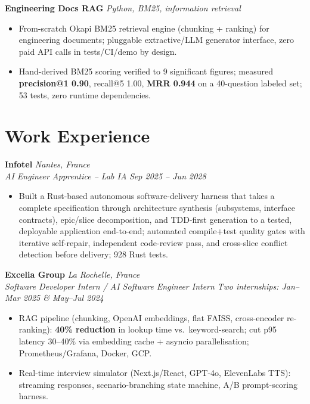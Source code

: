 \documentclass[10pt]{article}
\newcommand{\entry}[4]{%
  \noindent\textbf{#1} \hfill \textit{#2} \\
  \textit{#3} \hfill \textit{#4}\\[-0.3em]
}
\newcommand{\projectentry}[2]{%
  \noindent\textbf{#1} \hfill \textit{#2}\\[-0.3em]
}
\begin{document}
\projectentry{Engineering Docs RAG}{Python, BM25, information retrieval}
\begin{itemize}
  \item From-scratch Okapi BM25 retrieval engine (chunking + ranking) for engineering documents; pluggable extractive/LLM generator interface, zero paid API calls in tests/CI/demo by design.
  \item Hand-derived BM25 scoring verified to 9 significant figures; measured \textbf{precision@1 0.90}, recall@5 1.00, \textbf{MRR 0.944} on a 40-question labeled set; 53 tests, zero runtime dependencies.
\end{itemize}

\section*{Work Experience}
\entry{Infotel}{Nantes, France}{AI Engineer Apprentice -- Lab IA}{Sep 2025 -- Jun 2028}
\begin{itemize}
  \item Built a Rust-based autonomous software-delivery harness that takes a complete specification through architecture synthesis (subsystems, interface contracts), epic/slice decomposition, and TDD-first generation to a tested, deployable application end-to-end; automated compile+test quality gates with iterative self-repair, independent code-review pass, and cross-slice conflict detection before delivery; 928 Rust tests.
\end{itemize}
\entry{Excelia Group}{La Rochelle, France}{Software Developer Intern / AI Software Engineer Intern}{Two internships: Jan--Mar 2025 \& May--Jul 2024}
\begin{itemize}
  \item RAG pipeline (chunking, OpenAI embeddings, flat FAISS, cross-encoder re-ranking): \textbf{40\% reduction} in lookup time vs.\ keyword-search; cut p95 latency 30--40\% via embedding cache + asyncio parallelisation; Prometheus/Grafana, Docker, GCP.
  \item Real-time interview simulator (Next.js/React, GPT-4o, ElevenLabs TTS): streaming responses, scenario-branching state machine, A/B prompt-scoring harness.
\end{itemize}
\end{document}
